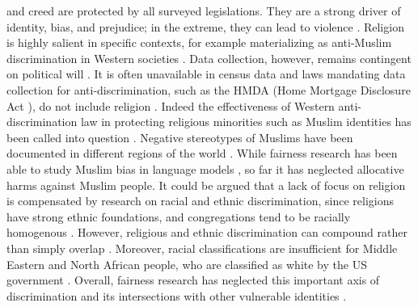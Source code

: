  and creed are protected by all surveyed legislations. They are a strong driver of identity, bias, and prejudice; in the extreme, they can lead to violence \citep{chuah2016religion,amarasingam2022fight}. Religion is highly salient in specific contexts, for example materializing as anti-Muslim discrimination in Western societies \citep{ahmed2010muslim,fernandez2023discrimination,abid2021persistent}. Data collection, however, remains contingent on political will \citep{sambasivan2021reimagining,ghumman2013religious}. It is often unavailable in census data \citep{gutierrez2017census,uscensus2022does} and laws mandating data collection for anti-discrimination, such as the HMDA (Home Mortgage Disclosure Act \citep{uscongress1975hmda}), do not include religion \citep{andrus2022demographic}. Indeed the effectiveness of Western anti-discrimination law in protecting religious minorities such as Muslim identities has been called into question \citep{bloul2008anti}. Negative stereotypes of Muslims have been documented in different regions of the world \citep{sides2013stereotypes,brown2017us,van2019muslim}. While fairness research has been able to study Muslim bias in language models \citep{abid2021persistent,muralidhar2021examining,dhamala2021bold}, so far it has neglected allocative harms against Muslim people. It could be argued that a lack of focus on religion is compensated by research on racial and ethnic discrimination, since religions have strong ethnic foundations, and congregations tend to be racially homogenous \citep{kim2011religion,chaves1998national}. However, religious and ethnic discrimination can compound rather than simply overlap \citep{distasio2021muslim}. Moreover, racial classifications are insufficient for Middle Eastern and North African people, who are classified as white by the US government \citep{maghbouleh2022middle}. Overall, fairness research has neglected this important axis of discrimination and its intersections with other vulnerable identities \citep{nadal2015qualitative,fernandez2023discrimination,sambasivan2021reimagining}.

